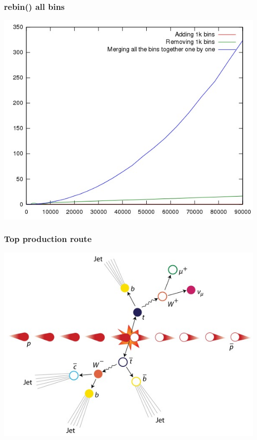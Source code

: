 \documentclass{beamer}
\begin{document}
  \begin{frame}
    \frametitle{rebin() all bins}
    \includegraphics[height=0.89\textheight]{2a.jpg}
  \end{frame}

  \begin{frame}
    \frametitle{Top production route}
    \includegraphics[height=0.89\textheight]{ttbar.jpg}
  \end{frame}
\end{document}
